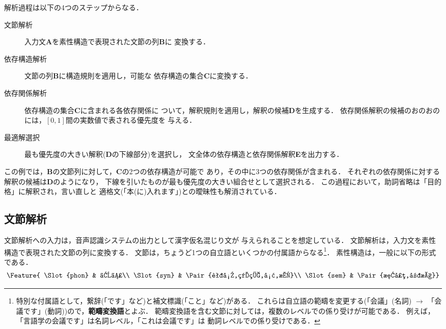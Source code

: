 解析過程は以下の4つのステップからなる．
\begin{description}
  \item[文節解析] 入力文{\bf A}を素性構造で表現された文節の列{\bf B}に
変換する． 
  \item[依存構造解析] 文節の列{\bf B}に構造規則を適用し，可能な
依存構造の集合{\bf C}に変換する．
  \item[依存関係解析] 依存構造の集合{\bf C}に含まれる各依存関係に
ついて，解釈規則を適用し，解釈の候補{\bf D}を生成する．
依存関係解釈の候補のおのおのには，$[0,1]$間の実数値で表される優先度を
与える．
  \item[最適解選択] 最も優先度の大きい解釈({\bf D}の下線部分)を選択し，
文全体の依存構造と依存関係解釈{\bf E}を出力する．
\end{description}

この例では，{\bf B}の文節列に対して，{\bf C}の2つの依存構造が可能で
あり，その中に3つの依存関係が含まれる．
それぞれの依存関係に対する解釈の候補は{\bf D}のようになり，
下線を引いたものが最も優先度の大きい組合せとして選択される．
この過程において，助詞省略は「目的格」に解釈され，言い直しと
適格文(「本(に)入れます」)との曖昧性も解消されている．

\subsection{文節解析}\label{sec:Uniform:Bunsetsu}

文節解析への入力は，音声認識システムの出力として漢字仮名混じり文が
与えられることを想定している．
文節解析は，入力文を素性構造で表現された文節の列に変換する．
文節は，ちょうど1つの自立語といくつかの付属語からなる\footnote{
  特別な付属語として，繋辞(「です」など)と補文標識(「こと」など)がある．
これらは自立語の範疇を変更する(「会議」(名詞) $\to$
「会議です」(動詞))ので，{\bf 範疇変換語}とよぶ．
範疇変換語を含む文節に対しては，複数のレベルでの係り受けが可能である．
例えば，「言語学の会議です」は名詞レベル，「これは会議です」は
動詞レベルでの係り受けである．
}．
素性構造は，一般に以下の形式である．
\begin{equation}\label{eq:Feature}
  \Feature{
    \Slot{phon} & よみ\\
    \Slot{syn} & \Pair{語彙,範疇,形,態}\\
    \Slot{sem} & \Pair{概念,属性}}
\end{equation}

